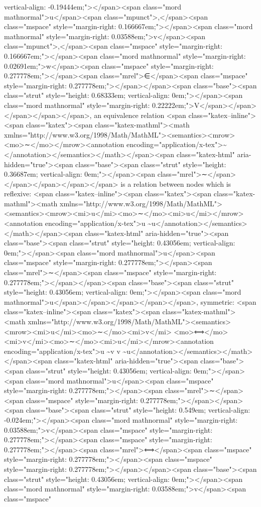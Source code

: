 vertical-align: -0.19444em;"></span><span class="mord mathnormal">u</span><span class="mpunct">,</span><span class="mspace" style="margin-right: 0.166667em;"></span><span class="mord mathnormal" style="margin-right: 0.03588em;">v</span><span class="mpunct">,</span><span class="mspace" style="margin-right: 0.166667em;"></span><span class="mord mathnormal" style="margin-right: 0.02691em;">w</span><span class="mspace" style="margin-right: 0.277778em;"></span><span class="mrel">∈</span><span class="mspace" style="margin-right: 0.277778em;"></span></span><span class="base"><span class="strut" style="height: 0.68333em; vertical-align: 0em;"></span><span class="mord mathnormal" style="margin-right: 0.22222em;">V</span></span></span></span></span>, an equivalence relation <span class="katex--inline"><span class="katex"><span class="katex-mathml"><math xmlns="http://www.w3.org/1998/Math/MathML"><semantics><mrow><mo>∼</mo></mrow><annotation encoding="application/x-tex">\sim</annotation></semantics></math></span><span class="katex-html" aria-hidden="true"><span class="base"><span class="strut" style="height: 0.36687em; vertical-align: 0em;"></span><span class="mrel">∼</span></span></span></span></span> is a relation between nodes which is reflexive: <span class="katex--inline"><span class="katex"><span class="katex-mathml"><math xmlns="http://www.w3.org/1998/Math/MathML"><semantics><mrow><mi>u</mi><mo>∼</mo><mi>u</mi></mrow><annotation encoding="application/x-tex">u  \sim u</annotation></semantics></math></span><span class="katex-html" aria-hidden="true"><span class="base"><span class="strut" style="height: 0.43056em; vertical-align: 0em;"></span><span class="mord mathnormal">u</span><span class="mspace" style="margin-right: 0.277778em;"></span><span class="mrel">∼</span><span class="mspace" style="margin-right: 0.277778em;"></span></span><span class="base"><span class="strut" style="height: 0.43056em; vertical-align: 0em;"></span><span class="mord mathnormal">u</span></span></span></span></span>, symmetric: <span class="katex--inline"><span class="katex"><span class="katex-mathml"><math xmlns="http://www.w3.org/1998/Math/MathML"><semantics><mrow><mi>u</mi><mo>∼</mo><mi>v</mi>  <mo>⟺</mo>  <mi>v</mi><mo>∼</mo><mi>u</mi></mrow><annotation encoding="application/x-tex">u \sim v \iff v \sim u</annotation></semantics></math></span><span class="katex-html" aria-hidden="true"><span class="base"><span class="strut" style="height: 0.43056em; vertical-align: 0em;"></span><span class="mord mathnormal">u</span><span class="mspace" style="margin-right: 0.277778em;"></span><span class="mrel">∼</span><span class="mspace" style="margin-right: 0.277778em;"></span></span><span class="base"><span class="strut" style="height: 0.549em; vertical-align: -0.024em;"></span><span class="mord mathnormal" style="margin-right: 0.03588em;">v</span><span class="mspace" style="margin-right: 0.277778em;"></span><span class="mspace" style="margin-right: 0.277778em;"></span><span class="mrel">⟺</span><span class="mspace" style="margin-right: 0.277778em;"></span><span class="mspace" style="margin-right: 0.277778em;"></span></span><span class="base"><span class="strut" style="height: 0.43056em; vertical-align: 0em;"></span><span class="mord mathnormal" style="margin-right: 0.03588em;">v</span><span class="mspace" 